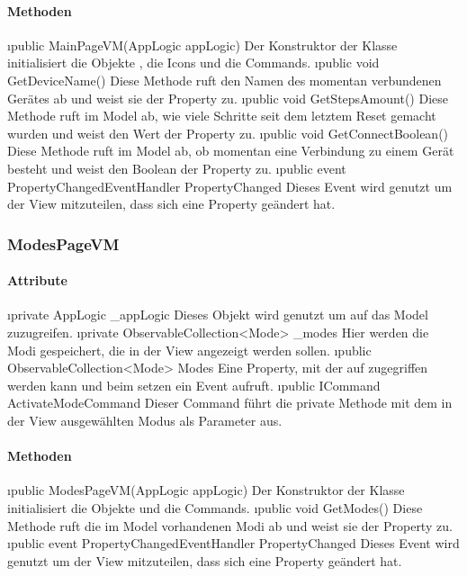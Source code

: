 \documentclass[../entwurf.tex]{subfiles}
\begin{document}
\paragraph{Methoden}
\begin{itemize}
	\i{public MainPageVM(AppLogic appLogic)} Der Konstruktor der Klasse initialisiert die Objekte , die Icons und die Commands.
	\i{public void GetDeviceName()} Diese Methode ruft den Namen des momentan verbundenen Gerätes ab und weist sie der Property  zu.
	\i{public void GetStepsAmount()} Diese Methode ruft im Model ab, wie viele Schritte seit dem letztem Reset gemacht wurden und weist den Wert der Property  zu.
	\i{public void GetConnectBoolean()} Diese Methode ruft im Model ab, ob momentan eine Verbindung zu einem Gerät besteht und weist den Boolean der Property  zu.
	\i{public event PropertyChangedEventHandler PropertyChanged} Dieses Event wird genutzt um der View mitzuteilen, dass sich eine Property geändert hat.
\end{itemize}
\subsubsection{ModesPageVM}
\paragraph{Attribute}
\begin{itemize}
	\i{private AppLogic \_appLogic} Dieses Objekt wird genutzt um auf das Model zuzugreifen.
	\i{private ObservableCollection<Mode> \_modes} Hier werden die Modi gespeichert, die in der View angezeigt werden sollen.
	\i{public ObservableCollection<Mode> Modes} Eine Property, mit der auf  zugegriffen werden kann und beim setzen ein Event aufruft.
	\i{public ICommand ActivateModeCommand} Dieser Command führt die private Methode  mit dem in der View ausgewählten Modus als Parameter aus.
\end{itemize}
\paragraph{Methoden}
\begin{itemize}
	\i{public ModesPageVM(AppLogic appLogic)} Der Konstruktor der Klasse initialisiert die Objekte  und die Commands.
	\i{public void GetModes()} Diese Methode ruft die im Model vorhandenen Modi ab und weist sie der Property  zu.
	\i{public event PropertyChangedEventHandler PropertyChanged} Dieses Event wird genutzt um der View mitzuteilen, dass sich eine Property geändert hat.
\end{itemize}
\end{document}
